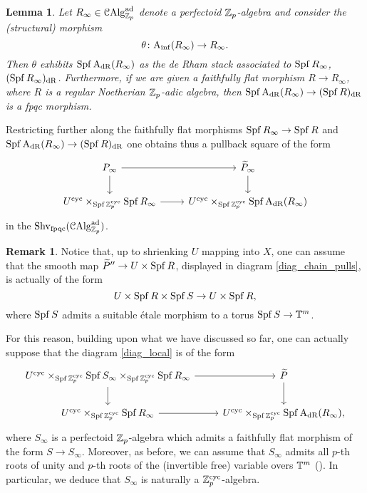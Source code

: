 \documentclass[10pt,a4paper]{amsart}
\numberwithin{equation}{subsection}
\newtheorem{lemma}[theorem]{Lemma}
\theoremstyle{definition}
\newtheorem{remark}[theorem]{Remark}
\begin{document}
\begin{lemma}
        Let $R_\infty \in \mathcal C \mathrm{Alg}^{\mathrm{ad}}_{\mathbb Z_p}$ denote a perfectoid $\mathbb Z_p$-algebra and consider the (structural) morphism
            \[
                \theta \colon \mathrm{A}_{\mathrm{inf}}(R_\infty) \to R_\infty  .
            \]
        Then $\theta$ exhibits $\operatorname{Spf} \mathrm{A}_{\mathrm{dR}}(R_\infty)$ as the \emph{de Rham stack} associated to $\operatorname{Spf} R_\infty$, $(\operatorname{Spf} R_\infty)_{\mathrm{dR}}$. Furthermore, if we are given a faithfully flat morphism $R \to R_\infty$, where $R$ is a regular Noetherian $\mathbb Z_p$-adic algebra, then
        $\operatorname{Spf} \mathrm{A}_{\mathrm{dR}}(R_\infty) \to (\operatorname{Spf} R)_{\mathrm{dR}}$ is a fpqc morphism.
\end{lemma}

Restricting further along the faithfully flat morphisms $\operatorname{Spf} R_\infty \to \operatorname{Spf} R$ and $\operatorname{Spf} \mathrm{A}_{\mathrm{dR}}(R_\infty) \to (\operatorname{Spf} R)_{\mathrm{dR}}$ one obtains thus a pullback square of the form
    \begin{equation} \label{diag_local}
    \begin{tikzcd}
        P_\infty \ar{r} \ar{d} & \tP_\infty \ar{d} \\
        U^\cyc \times_{\Spf \cycbZp} \Spf R_\infty \ar{r} & U^\cyc \times_{\Spf \cycbZp} \Spf \AdR(R_\infty)
    \end{tikzcd}    
    \end{equation}
in the \infcat $\mathrm{Shv}_{\mathrm{fpqc}}(\mathcal C \mathrm{Alg}^{\mathrm{ad}}_{\mathbb Z_p})$.

\begin{remark}
Notice that, up to shrienking $U$ mapping into $X$, one can assume that the smooth map $\widetilde{P}'' \to U \times \operatorname{Spf} R$, displayed in diagram \eqref{diag_chain_pulls}, is actually of the form
    \[
            U \times \operatorname{Spf} R \times \operatorname{Spf} S \to U \times \operatorname{Spf} R ,  
    \]
where $\operatorname{Spf} S $ admits a suitable \'etale morphism to a torus $\operatorname{Spf} S \to \mathbb T^m$. 
\end{remark}

For this reason, building upon what we have discussed so far, one can actually suppose that the diagram \eqref{diag_local} is of the form
    \[
    \begin{tikzcd}
        U^\cyc \times_{\Spf \cycbZp} \Spf S_\infty \times_{\Spf \bZp^\cyc} \Spf R_\infty \ar{r} \ar{d} & \tP \ar{d} \\
        U^\cyc \times_{\Spf \cycbZp} \Spf R_\infty \ar{r} & U^\cyc \times_{\Spf \bZp^\cyc} \Spf \AdR(R_\infty),
    \end{tikzcd}
    \]
where $S_\infty$ is a perfectoid $\mathbb Z_p$-algebra which admits a faithfully flat morphism of the form $S \to S_\infty$. Moreover, as before, we can assume that $S_\infty$ admits all $p$-th roots of unity and $p$-th roots of the (invertible free) variable overs $\mathbb T^m$ (). In particular, we deduce that $S_\infty$ is naturally a $\mathbb Z_p^{\mathrm{cyc}}$-algebra.
\end{document}
